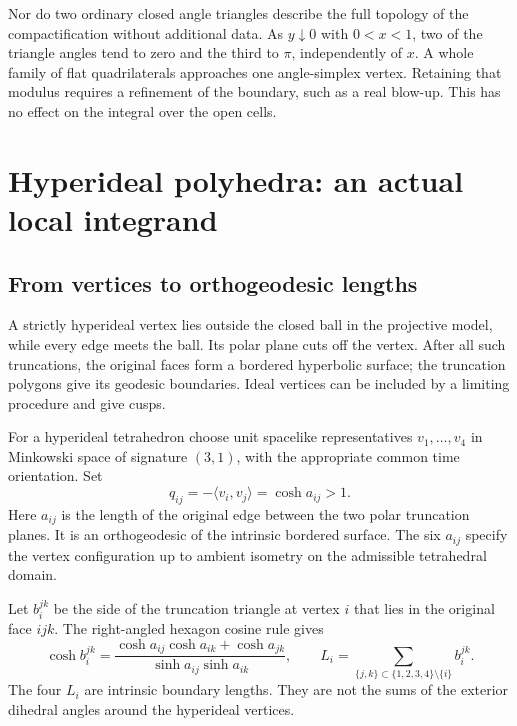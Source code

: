 \documentclass[11pt,a4paper]{article}
\numberwithin{equation}{section}
\theoremstyle{definition}
\theoremstyle{remark}
\begin{document}
Nor do two ordinary closed angle triangles describe the full topology of
the compactification without additional data. As $y\downarrow0$ with
$0<x<1$, two of the triangle angles tend to zero and the third to $\pi$,
independently of $x$. A whole family of flat quadrilaterals approaches one
angle-simplex vertex. Retaining that modulus requires a refinement of the
boundary, such as a real blow-up. This has no effect on the integral over
the open cells.

\section{Hyperideal polyhedra: an actual local integrand}
\label{sec:hyperideal}

\subsection{From vertices to orthogeodesic lengths}

A strictly hyperideal vertex lies outside the closed ball in the projective
model, while every edge meets the ball. Its polar plane cuts off the vertex.
After all such truncations, the original faces form a bordered hyperbolic
surface; the truncation polygons give its geodesic boundaries. Ideal vertices
can be included by a limiting procedure and give cusps.

For a hyperideal tetrahedron choose unit spacelike representatives
$v_1,\ldots,v_4$ in Minkowski space of signature $(3,1)$, with the appropriate
common time orientation. Set
\begin{equation}
 q_{ij}=-\langle v_i,v_j\rangle=\cosh a_{ij}>1.
 \label{eq:qvertices}
\end{equation}
Here $a_{ij}$ is the length of the original edge between the two polar
truncation planes. It is an orthogeodesic of the intrinsic bordered surface.
The six $a_{ij}$ specify the vertex configuration up to ambient isometry on
the admissible tetrahedral domain.

Let $b_i^{jk}$ be the side of the truncation triangle at vertex $i$ that lies
in the original face $ijk$. The right-angled hexagon cosine rule gives
\begin{equation}
 \cosh b_i^{jk}=
 \frac{\cosh a_{ij}\cosh a_{ik}+\cosh a_{jk}}
      {\sinh a_{ij}\sinh a_{ik}},
 \qquad
 L_i=\sum_{\{j,k\}\subset\{1,2,3,4\}\setminus\{i\}}b_i^{jk}.
 \label{eq:truncationlengths}
\end{equation}
The four $L_i$ are intrinsic boundary lengths. They are not the sums of the
exterior dihedral angles around the hyperideal vertices.
\end{document}
